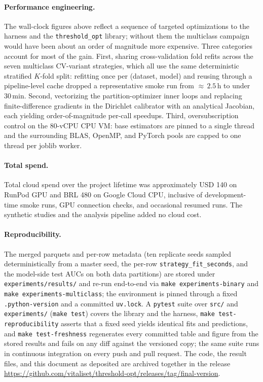 \paragraph{Performance engineering.} The wall-clock figures above reflect a sequence of targeted optimizations to the harness and the \texttt{threshold\_opt} library; without them the multiclass campaign would have been about an order of magnitude more expensive. Three categories account for most of the gain. First, sharing cross-validation fold refits across the seven multiclass CV-variant strategies, which all use the same deterministic stratified $K$-fold split: refitting once per (dataset, model) and reusing through a pipeline-level cache dropped a representative smoke run from ${\approx}\,2.5\,\text{h}$ to under $30\,\text{min}$. Second, vectorizing the partition-optimizer inner loops and replacing finite-difference gradients in the Dirichlet calibrator with an analytical Jacobian, each yielding order-of-magnitude per-call speedups. Third, oversubscription control on the 80-vCPU CPU VM\@: base estimators are pinned to a single thread and the surrounding BLAS, OpenMP, and PyTorch pools are capped to one thread per joblib worker.

\paragraph{Total spend.} Total cloud spend over the project lifetime was approximately USD 140 on RunPod GPU and BRL 480 on Google Cloud CPU, inclusive of development-time smoke runs, GPU connection checks, and occasional resumed runs. The synthetic studies and the analysis pipeline added no cloud cost.

\paragraph{Reproducibility.} The merged parquets and per-row metadata (ten replicate seeds sampled deterministically from a master seed, the per-row \texttt{strategy\_fit\_seconds}, and the model-side test AUCs on both data partitions) are stored under \texttt{experiments/results/} and re-run end-to-end via \texttt{make experiments-binary} and \texttt{make experiments-multiclass}; the environment is pinned through a fixed \texttt{.python-version} and a committed \texttt{uv.lock}. A \texttt{pytest} suite over \texttt{src/} and \texttt{experiments/} (\texttt{make test}) covers the library and the harness, \texttt{make test-reproducibility} asserts that a fixed seed yields identical fits and predictions, and \texttt{make test-freshness} regenerates every committed table and figure from the stored results and fails on any diff against the versioned copy; the same suite runs in continuous integration on every push and pull request. The code, the result files, and this document as deposited are archived together in the release \url{https://github.com/vitaliset/threshold-opt/releases/tag/final-version}.
